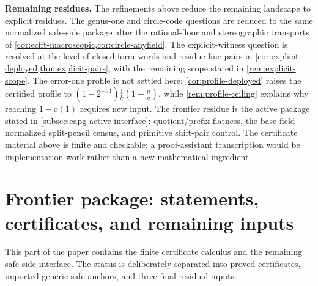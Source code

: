 \documentclass[11pt]{article}
\theoremstyle{definition}
\theoremstyle{remark}
\newcommand{\F}{\mathbb{F}}
\newcommand{\RS}{\mathrm{RS}}
\newcommand{\UU}{\mathbb{U}}
\begin{document}
\medskip
\noindent\textbf{Remaining residues.}
The refinements above reduce the remaining landscape to explicit residues.  The genus-one and circle-code questions are reduced to the same normalized safe-side package after the rational-floor and stereographic transports of \cref{cor:ecfft-macroscopic,cor:circle-anyfield}.  The explicit-witness question is resolved at the level of closed-form words and residue-line pairs in \cref{cor:explicit-deployed,thm:explicit-pairs}, with the remaining scope stated in \cref{rem:explicit-scope}.  The error-one profile is not settled here: \cref{cor:profile-deployed} raises the certified profile to $(1-2^{-54})\frac1k(1-\frac nq)$, while \cref{rem:profile-ceiling} explains why reaching $1-o(1)$ requires new input.  The frontier residue is the active package stated in \cref{subsec:capg-active-interface}: quotient/prefix flatness, the base-field-normalized split-pencil census, and primitive shift-pair control.  The certificate material above is finite and checkable; a proof-assistant transcription would be implementation work rather than a new mathematical ingredient.




\providecommand{\F}{\mathbb F}
\providecommand{\RS}{\mathrm{RS}}
\providecommand{\ImgFib}{\operatorname{ImgFib}}
\providecommand{\Paid}{\operatorname{Paid}}
\providecommand{\Dloc}{\mathcal D}
\providecommand{\PP}{\mathbb P}
\providecommand{\E}{\mathbb E}
\providecommand{\Var}{\operatorname{Var}}
\providecommand{\Span}{\operatorname{span}}
\providecommand{\UU}{\mathbb U}
\providecommand{\ceil}[1]{\left\lceil #1\right\rceil}
\providecommand{\floor}[1]{\left\lfloor #1\right\rfloor}

\section{Frontier package: statements, certificates, and remaining inputs}\label{sec:frontier-package}

This part of the paper contains the finite certificate calculus and the remaining safe-side interface.  The status is deliberately separated into proved certificates, imported generic safe anchors, and three final residual inputs.
\end{document}

